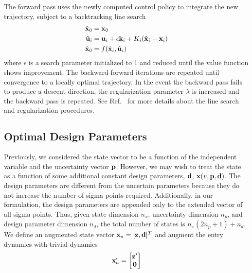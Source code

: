The forward pass uses the newly computed control policy to integrate the new trajectory, subject to a backtracking line search
\begin{align}
	\hat{\mathbf{x}}_0 &= \mathbf{x}_0 \\
	\hat{\mathbf{u}}_{i} &= \mathbf{u}_i + \epsilon \mathbf{k}_i + K_i(\hat{\mathbf{x}}_i - \mathbf{x}_i)\\
	\hat{\mathbf{x}}_0 &= f(\hat{\mathbf{x}}_i,\hat{\mathbf{u}}_i)
\end{align}
where $\epsilon$ is a search parameter initialized to 1 and reduced until the value function shows improvement. The backward-forward iterations are repeated until convergence to a locally optimal trajectory. In the event the backward pass fails to produce a descent direction, the regularization parameter $\lambda$ is increased and the backward pass is repeated. See Ref.~\cite{DDP_ControlLimited} for more details about the line search and regularization procedures. 

\subsection{Optimal Design Parameters}\label{Sec:DesignOptimization}
Previously, we considered the state vector to be a function of the independent variable and the uncertainty vector $\mathbf{p}$. However, we may wish to treat the state as a function of some additional constant design parameters, $\mathbf{d}$, $\mathbf{x}(v, \mathbf{p}, \mathbf{d})$. The design parameters are different from the uncertain parameters because they do not increase the number of sigma points required. Additionally, in our formulation, the design parameters are appended only to the extended vector of all sigma points. Thus, given state dimension $n_x$, uncertainty dimension $n_p$, and design parameter dimension $n_d$, the total number of states is $n_x(2n_p+1) + n_d$. We define an augmented state vector $\mathbf{x}_a = [\mathbf{z}, \mathbf{d}]^T$ 
and augment the entry dynamics with trivial dynamics
\begin{align}
	\mathbf{x}_a' = \left[
	\begin{matrix}
		\mathbf{z}' \\
		\mathbf{0}
	\end{matrix}
	\right]
\end{align}

